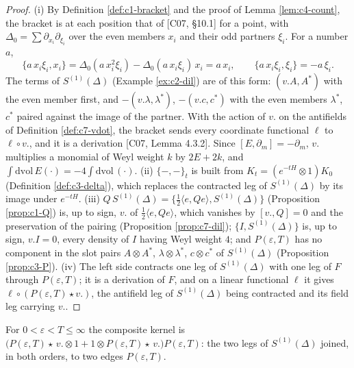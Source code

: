 \begin{proof}
(i) By Definition \ref{def:c1-bracket} and the proof of Lemma \ref{lem:c4-count}, the bracket is at each position that of [C07, §10.1] for a point, with $\Delta_0=\sum\partial_{x_i}\partial_{\xi_i}$ over the even members $x_i$ and their odd partners $\xi_i$. For a number $a$,
\[
\{a\,x_i\xi_i,x_i\}=\Delta_0(a\,x_i^2\xi_i)-\Delta_0(a\,x_i\xi_i)\,x_i=a\,x_i,\qquad \{a\,x_i\xi_i,\xi_i\}=-a\,\xi_i .
\]
The terms of $S^{(1)}(\Delta)$ (Example \ref{ex:c2-dil}) are of this form: $(v.A,A^*)$ with the even member first, and $-(v.\lambda,\lambda^*)$, $-(v.c,c^*)$ with the even members $\lambda^*$, $c^*$ paired against the image of the partner. With the action of $v.$ on the antifields of Definition \ref{def:c7-vdot}, the bracket sends every coordinate functional $\ell$ to $\ell\circ v.$, and it is a derivation [C07, Lemma 4.3.2]. Since $[E,\partial_m]=-\partial_m$, $v.$ multiplies a monomial of Weyl weight $k$ by $2E+2k$, and $\int\mathrm{dvol}\,E(\cdot)=-4\int\mathrm{dvol}\,(\cdot)$. (ii) $\{-,-\}_t$ is built from $K_t=(e^{-tH}\otimes1)K_0$ (Definition \ref{def:c3-delta}), which replaces the contracted leg of $S^{(1)}(\Delta)$ by its image under $e^{-tH}$. (iii) $Q\,S^{(1)}(\Delta)=\{\tfrac12\langle e,Qe\rangle,S^{(1)}(\Delta)\}$ (Proposition \ref{prop:c1-Q}) is, up to sign, $v.$ of $\tfrac12\langle e,Qe\rangle$, which vanishes by $[v.,Q]=0$ and the preservation of the pairing (Proposition \ref{prop:c7-dil}); $\{I,S^{(1)}(\Delta)\}$ is, up to sign, $v.I=0$, every density of $I$ having Weyl weight $4$; and $P(\varepsilon,T)$ has no component in the slot pairs $A\otimes A^*$, $\lambda\otimes\lambda^*$, $c\otimes c^*$ of $S^{(1)}(\Delta)$ (Proposition \ref{prop:c3-P}). (iv) The left side contracts one leg of $S^{(1)}(\Delta)$ with one leg of $F$ through $P(\varepsilon,T)$; it is a derivation of $F$, and on a linear functional $\ell$ it gives $\ell\circ(P(\varepsilon,T)\star v.)$, the antifield leg of $S^{(1)}(\Delta)$ being contracted and its field leg carrying $v.$.
\end{proof}

\begin{definition}
\label{def:c9-composite}
For $0<\varepsilon<T\le\infty$ the composite kernel is $\big(P(\varepsilon,T)\star\,v.\otimes1+1\otimes P(\varepsilon,T)\star\,v.\big)P(\varepsilon,T)$: the two legs of $S^{(1)}(\Delta)$ joined, in both orders, to two edges $P(\varepsilon,T)$.
\end{definition}

